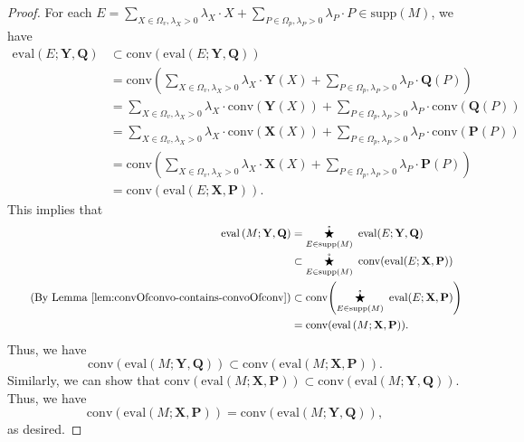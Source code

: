 \documentclass[10pt]{amsart}
\theoremstyle{plain}
\theoremstyle{definition}
\providecommand{\bP}[0]{\ensuremath{\mathbf P}\xspace}
\providecommand{\bQ}[0]{\ensuremath{\mathbf Q}\xspace}
\providecommand{\bX}[0]{\ensuremath{\mathbf X}\xspace}
\providecommand{\bY}[0]{\ensuremath{\mathbf Y}\xspace}
\providecommand{\Cmult}[0]{\ensuremath{\mathop{\mathring{\bigstar}}}\xspace}
\providecommand{\conv}[1]{\ensuremath{\mathrm{conv}{\left({#1}\right)}\xspace}}
\providecommand{\evalmap}[0]{\ensuremath{\mathrm{eval}}\xspace}
\providecommand{\elem}[0]{\ensuremath{\mathrm{supp}}\xspace}
\begin{document}
\begin{proof}
For each $E = 
\sum_{X \in \Omega_v, \lambda_X > 0} \lambda_X \cdot X + \sum_{P \in \Omega_p, \lambda_P > 0}\lambda_P \cdot P \in \elem(M)$, we have
\begin{align*}
    \evalmap\left(E;\bY,\bQ\right)&\subset \conv{\evalmap(E;\bY,\bQ)}\\
    &=\conv{\sum_{X \in \Omega_v, \lambda_X > 0} \lambda_X \cdot \bY(X) + \sum_{P \in \Omega_p, \lambda_P > 0} \lambda_P \cdot \bQ(P)}\\
    &= \sum_{X \in \Omega_v, \lambda_X > 0} \lambda_X\cdot \conv{\bY(X)} + 
    \sum_{P \in \Omega_p, \lambda_P > 0} \lambda_P \cdot \conv{\bQ(P)} \\
    &=\sum_{X \in \Omega_v, \lambda_X > 0} \lambda_X\cdot \conv{\bX(X)} + 
    \sum_{P \in \Omega_p, \lambda_P > 0} \lambda_P \cdot \conv{\bP(P)} \\
    &=\conv{\sum_{X \in \Omega_v, \lambda_X > 0} \lambda_X \cdot \bX(X) + \sum_{P \in \Omega_p, \lambda_P > 0} \lambda_P \cdot \bP(P)}\\
    &=\conv{\evalmap(E; \bX,\bP)}.
\end{align*}
This implies that
    \begin{align*}
        \evalmap\left(M; \bY,\bQ\right)&=\Cmult_{E\in\elem(M)} ~ \evalmap(E;\bY,\bQ)\\
        &\subset \Cmult_{E\in\elem(M)} ~ \conv{\evalmap(E;\bX,\bP)}\\ \tag{By Lemma~\ref{lem:convOfconvo-contains-convoOfconv}}
        &\subset \conv{\Cmult_{E\in\elem(M)} ~ \evalmap(E;\bX,\bP)}\\
        &= \conv{\evalmap\left(M; \bX,\bP\right)}.
    \end{align*}
    Thus, we have
$$\conv{\evalmap\left(M; \bY,\bQ\right)}\subset \conv{\evalmap\left(M; \bX,\bP\right)}.$$
Similarly, we can show that $\conv{\evalmap\left(M; \bX,\bP\right)}\subset \conv{\evalmap\left(M; \bY,\bQ\right)}$. Thus, we have $$\conv{\evalmap\left(M; \bX,\bP\right)}= \conv{\evalmap\left(M; \bY,\bQ\right)},$$ as desired. 
\end{proof}
\end{document}
